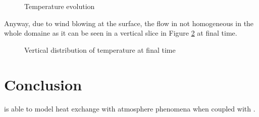 \begin{figure} [H]
\centering
{}
\caption{Temperature evolution}
\label{fig:heat_exchange:res_temp_segment}
\end{figure}

Anyway, due to wind blowing at the surface, the flow in not homogeneous in the
whole domaine as it can be seen in a vertical slice in
Figure \ref{fig:heat_exchange:res_temp_section} at final time.

\begin{figure}[H]
\centering
{}
\caption{Vertical distribution of temperature at final time}
\label{fig:heat_exchange:res_temp_section}
\end{figure}
%
\section{Conclusion}
%
\waqtel is able to model heat exchange with atmosphere phenomena when coupled
with .
%

